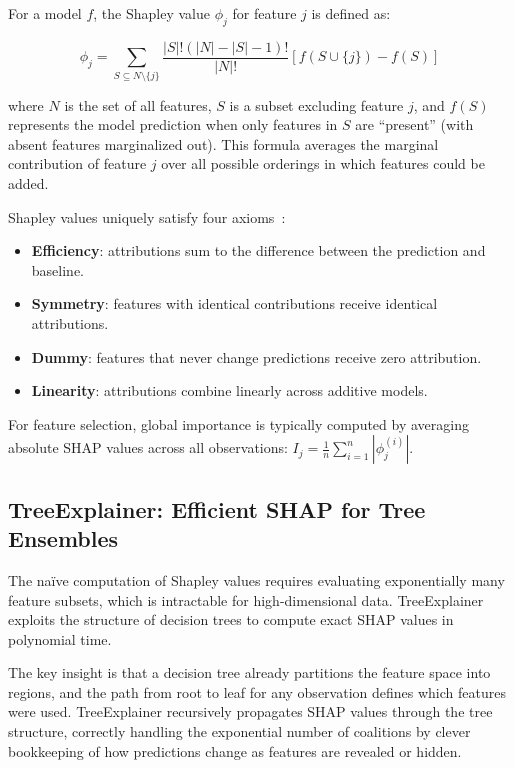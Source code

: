For a model $f$, the Shapley value $\phi_j$ for feature $j$ is defined as:

\begin{equation}
\phi_j = \sum_{S \subseteq N \setminus \{j\}} \frac{|S|!(|N|-|S|-1)!}{|N|!} \left[ f(S \cup \{j\}) - f(S) \right]
\end{equation}

where $N$ is the set of all features, $S$ is a subset excluding feature $j$, and $f(S)$ represents the model prediction when only features in $S$ are ``present'' (with absent features marginalized out). This formula averages the marginal contribution of feature $j$ over all possible orderings in which features could be added.

Shapley values uniquely satisfy four axioms~\cite{fryer2021shapley}:
\begin{itemize}
    \item \textbf{Efficiency}: attributions sum to the difference between the prediction and baseline.
    \item \textbf{Symmetry}: features with identical contributions receive identical attributions.
    \item \textbf{Dummy}: features that never change predictions receive zero attribution.
    \item \textbf{Linearity}: attributions combine linearly across additive models.
\end{itemize}

For feature selection, global importance is typically computed by averaging absolute SHAP values across all observations: $I_j = \frac{1}{n}\sum_{i=1}^{n}|\phi_j^{(i)}|$.

\subsection{TreeExplainer: Efficient SHAP for Tree Ensembles}

The na\"ive computation of Shapley values requires evaluating exponentially many feature subsets, which is intractable for high-dimensional data. TreeExplainer~\cite{lundberg2020local} exploits the structure of decision trees to compute exact SHAP values in polynomial time.

The key insight is that a decision tree already partitions the feature space into regions, and the path from root to leaf for any observation defines which features were used. TreeExplainer recursively propagates SHAP values through the tree structure, correctly handling the exponential number of coalitions by clever bookkeeping of how predictions change as features are revealed or hidden.

